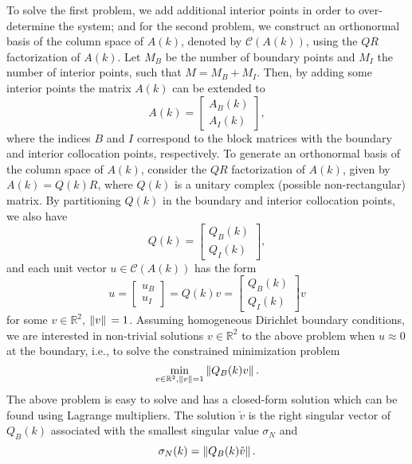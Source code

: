 To solve the first problem, we add additional interior points in order to over-determine the system; and for the second problem, we construct an orthonormal basis of the column space of \(A(k)\), denoted by \(\mathcal{C}(A(k))\), using the \(QR\) factorization of \(A(k)\). Let \(M_B\) be the number of boundary points and \(M_I\) the number of interior points, such that \(M=M_B+M_I\). Then, by adding some interior points the matrix \(A(k)\) can be extended to
\[
    A(k) = \begin{bmatrix}
        A_B(k)\\
        A_I(k)
    \end{bmatrix},
\]
where the indices \(B\) and \(I\) correspond to the block matrices with the boundary and interior collocation points, respectively. To generate an orthonormal basis of the column space of \(A(k)\), consider the \(QR\) factorization of \(A(k)\), given by \(A(k)=Q(k)R\), where \(Q(k)\) is a unitary complex (possible non-rectangular) matrix. By partitioning \(Q(k)\) in the boundary and interior collocation points, we also have
\begin{equation*}
    Q(k) = \begin{bmatrix}
        Q_B(k)\\
        Q_I(k)
    \end{bmatrix},
\end{equation*}
and each unit vector \(u \in \mathcal{C}(A(k))\) has the form
\begin{equation}\label{sat_qr}
    u = \begin{bmatrix}
        u_B\\
        u_I
    \end{bmatrix} = Q(k)v = \begin{bmatrix}
        Q_B(k)\\
        Q_I(k)
    \end{bmatrix}v
\end{equation}
for some \(v \in \mathbb{R}^2\), \(\norm*{v} = 1\). Assuming homogeneous Dirichlet boundary conditions, we are interested in non-trivial solutions \(v \in \mathbb{R}^2\) to the above problem when \(u \approx 0\) at the boundary, i.e., to solve the constrained minimization problem
\[
    \min_{v \in \mathbb{R}^2, \norm*{v}=1} \norm*{Q_B(k) v}. 
\]
The above problem is easy to solve and has a closed-form solution which can be found using Lagrange multipliers. The solution \(\check{v}\) is the right singular vector of \(Q_B(k)\) associated with the smallest singular value \(\sigma_N\) and
\[
    \sigma_N(k) = \norm*{Q_B(k) \check{v}}.
\]
